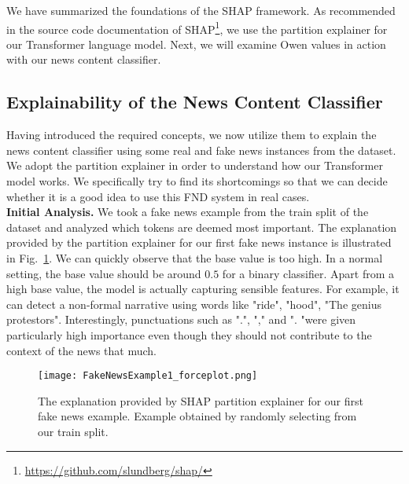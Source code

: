 We have summarized the foundations of the SHAP framework. As recommended in the source code documentation of SHAP\footnote{\url{https://github.com/slundberg/shap/}}, we use the partition explainer for our Transformer language model. Next, we will examine Owen values in action with our news content classifier.

\subsection{Explainability of the News Content Classifier}
\label{subsec:ExplainingNewsContentModels_ExplainingNewsContentClassifier}
Having introduced the required concepts, we now utilize them to explain the news content classifier using some real and fake news instances from the dataset. We adopt the partition explainer in order to understand how our Transformer model works. We specifically try to find its shortcomings so that we can decide whether it is a good idea to use this FND system in real cases.\\
\textbf{Initial Analysis.} We took a fake news example from the train split of the dataset and analyzed which tokens are deemed most important. The explanation provided by the partition explainer for our first fake news instance is illustrated in Fig.~\ref{fig:FakeNewsExample1_forceplot}. We can quickly observe that the base value is too high. In a normal setting, the base value should be around $0.5$ for a binary classifier. Apart from a high base value, the model is actually capturing sensible features. For example, it can detect a non-formal narrative using words like "ride", "hood", "The genius protestors".  Interestingly, punctuations such as ".", "," and ". "were given particularly high importance even though they should not contribute to the context of the news that much.\\
\begin{figure}
    \centering
    \texttt{[image: FakeNewsExample1\_forceplot.png]}
    \caption[The explanation provided by SHAP partition explainer for our first fake news example.]{The explanation provided by SHAP partition explainer for our first fake news example. Example obtained by randomly selecting from our train split.}
    \label{fig:FakeNewsExample1_forceplot}
\end{figure}
